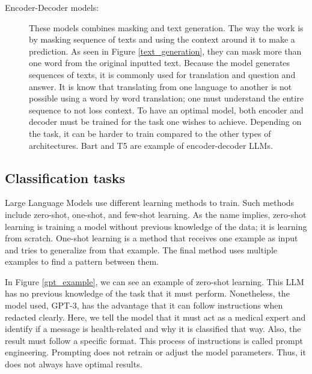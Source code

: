 \begin{description}
\item[Encoder-Decoder models:] These models combines masking and text generation. The way the work is by masking sequence of texts and using the context around it to make a prediction. As seen
in Figure \ref{text_generation}, they can mask more than one word from the original inputted text. Because the model generates sequences of texts, it is commonly used for translation
and question and answer. It is know that translating from one language to another is not possible using a word by word translation; one must understand the entire sequence to not loss context.
To have an optimal model, both encoder and decoder must be trained for the task one wishes to achieve. Depending on the task, it can be harder to train compared to the other types of architectures.
Bart \cite{lewis2019bartdenoisingsequencetosequencepretraining} and T5 \cite{chung2022scalinginstructionfinetunedlanguagemodels} are example of encoder-decoder LLMs.

\end{description}

\subsection{Classification tasks}
Large Language Models use different learning methods to train. Such methods include zero-shot, one-shot, and few-shot learning. As the name implies, zero-shot learning is training a model without
previous knowledge of the data; it is learning from scratch. One-shot learning is a method that receives one example as input and tries to generalize from that example. The final method uses
multiple examples to find a pattern between them. 

In Figure \ref{gpt_example}, we can see an example of zero-shot learning. This LLM has no previous knowledge of the task that it must perform. Nonetheless, the model used, GPT-3, has the 
advantage that it can follow instructions when redacted clearly. Here, we tell the model that it must act as a medical expert and identify if a message is health-related and why it is classified that way. 
Also, the result must follow a specific format. This process of instructions is called prompt engineering. Prompting does not retrain or adjust the model parameters. Thus, it does not always have optimal results.  
 
